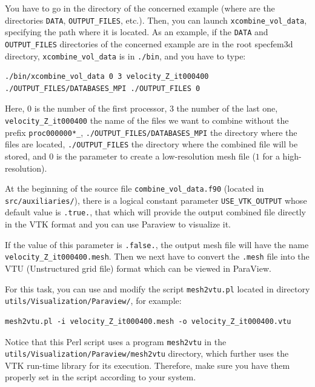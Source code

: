 You have to go in the directory of the concerned example (where are the directories \texttt{DATA}, \texttt{OUTPUT\_FILES}, etc.).
Then, you can launch \texttt{xcombine\_vol\_data}, specifying the path where it is located. As an example, if the \texttt{DATA} and \texttt{OUTPUT\_FILES} directories of the concerned example are in the root specfem3d directory, \texttt{xcombine\_vol\_data} is in \texttt{./bin}, and you have to type:

{\footnotesize
\begin{verbatim}
./bin/xcombine_vol_data 0 3 velocity_Z_it000400 ./OUTPUT_FILES/DATABASES_MPI ./OUTPUT_FILES 0
\end{verbatim}
}
Here, $0$ is the number of the first processor, $3$ the number of the last one, \texttt{velocity\_Z\_it000400} the name of the files we want to combine without the prefix \texttt{proc000000*\_}, \texttt{./OUTPUT\_FILES/DATABASES\_MPI} the directory where the files are located, \texttt{./OUTPUT\_FILES} the directory where the combined file will be stored, and $0$ is the parameter to create a low-resolution mesh file ($1$ for a high-resolution).

\medskip

At the beginning of the source file \texttt{combine\_vol\_data.f90} (located in \texttt{src/auxiliaries/}), there is a logical constant parameter \texttt{USE\_VTK\_OUTPUT} whose default value is \texttt{.true.}, that which will provide the output combined file directly in the VTK format and you can use Paraview to visualize it.

\medskip

If the value of this parameter is \texttt{.false.}, the output mesh file will have the name \texttt{velocity\_Z\_it000400.mesh}. Then we next have to convert the
\texttt{.mesh} file into the VTU (Unstructured grid file) format which can be viewed in ParaView.

\noindent
For this task, you can use and modify the
script \texttt{mesh2vtu.pl} located in directory \texttt{\small utils/Visualization/Paraview/}, for example:

{\footnotesize
\begin{verbatim}
mesh2vtu.pl -i velocity_Z_it000400.mesh -o velocity_Z_it000400.vtu
\end{verbatim}
}

Notice that this Perl script uses a program \texttt{mesh2vtu} in the \texttt{utils/Visualization/Paraview/mesh2vtu} directory, which further
uses the VTK  run-time library for its execution. Therefore, make sure you have them properly set
in the script according to your system.

